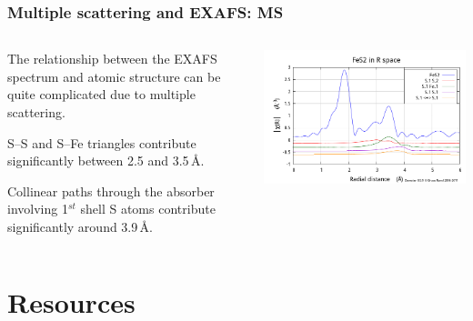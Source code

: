 \documentclass[10pt, xcolor=x11names, compress]{beamer}
\begin{document}
\begin{frame}
  \frametitle{Multiple scattering and EXAFS: MS}
  \begin{columns}
    \begin{column}{0.5\linewidth}
      The relationship between the EXAFS spectrum and atomic
      structure can be quite complicated due to multiple
      scattering.

      \medskip

      S--S and S--Fe triangles contribute
      significantly between 2.5 and 3.5\,\AA.

      \medskip

      Collinear paths through the absorber involving 1$^{st}$ shell S
      atoms contribute significantly around 3.9\,\AA.
    \end{column}
    \begin{column}{0.5\linewidth}
      \includegraphics[width=\linewidth]{images/fes2_ms.png}
    \end{column}
  \end{columns}
\end{frame}

\section[Resources]{Resources}
\end{document}
